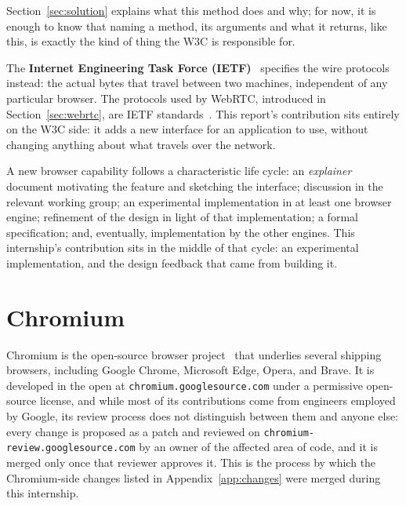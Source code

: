 \documentclass[11pt]{article}
\begin{document}
Section~\ref{sec:solution} explains what this method does and why; for now, it is enough to know that naming a method, its arguments and what it returns, like this, is exactly the kind of thing the W3C is responsible for.

The \textbf{Internet Engineering Task Force (IETF)}~\cite{ietf} specifies the wire protocols instead: the actual bytes that travel between two machines, independent of any particular browser. The protocols used by WebRTC, introduced in Section~\ref{sec:webrtc}, are IETF standards~\cite{rfc8825}. This report's contribution sits entirely on the W3C side: it adds a new interface for an application to use, without changing anything about what travels over the network.

A new browser capability follows a characteristic life cycle: an \emph{explainer} document motivating the feature and sketching the interface; discussion in the relevant working group; an experimental implementation in at least one browser engine; refinement of the design in light of that implementation; a formal specification; and, eventually, implementation by the other engines. This internship's contribution sits in the middle of that cycle: an experimental implementation, and the design feedback that came from building it.

\section{Chromium}
\label{sec:chromium}

Chromium is the open-source browser project~\cite{chromiumprojects} that underlies several shipping browsers, including Google Chrome, Microsoft Edge, Opera, and Brave. It is developed in the open at \texttt{chromium.googlesource.com} under a permissive open-source license, and while most of its contributions come from engineers employed by Google, its review process does not distinguish between them and anyone else: every change is proposed as a patch and reviewed on \texttt{chromium-review.googlesource.com} by an owner of the affected area of code, and it is merged only once that reviewer approves it. This is the process by which the Chromium-side changes listed in Appendix~\ref{app:changes} were merged during this internship.
\end{document}
